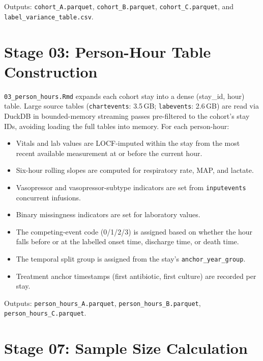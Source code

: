 Outputs: \texttt{cohort\_A.parquet}, \texttt{cohort\_B.parquet},
\texttt{cohort\_C.parquet}, and \texttt{label\_variance\_table.csv}.

\section{Stage 03: Person-Hour Table Construction}

\texttt{03\_person\_hours.Rmd} expands each cohort stay into a dense
(stay\_id, hour) table. Large source tables (\texttt{chartevents}: 3.5\,GB;
\texttt{labevents}: 2.6\,GB) are read via DuckDB in bounded-memory streaming
passes pre-filtered to the cohort's stay IDs, avoiding loading the full tables
into memory. For each person-hour:

\begin{itemize}
  \item Vitals and lab values are LOCF-imputed within the stay from the most
  recent available measurement at or before the current hour.
  \item Six-hour rolling slopes are computed for respiratory rate, MAP, and
  lactate.
  \item Vasopressor and vasopressor-subtype indicators are set from
  \texttt{inputevents} concurrent infusions.
  \item Binary missingness indicators are set for laboratory values.
  \item The competing-event code (0/1/2/3) is assigned based on whether the
  hour falls before or at the labelled onset time, discharge time, or death time.
  \item The temporal split group is assigned from the stay's
  \texttt{anchor\_year\_group}.
  \item Treatment anchor timestamps (first antibiotic, first culture) are
  recorded per stay.
\end{itemize}

Outputs: \texttt{person\_hours\_A.parquet}, \texttt{person\_hours\_B.parquet},
\texttt{person\_hours\_C.parquet}.

\section{Stage 07: Sample Size Calculation}

